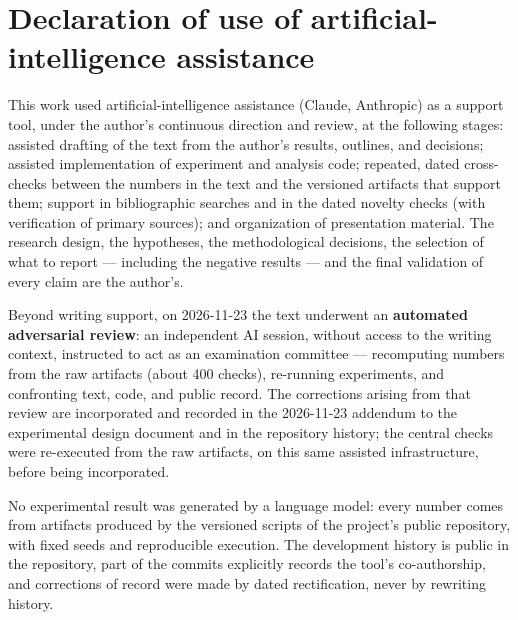 \chapter*{Declaration of use of artificial-intelligence assistance}
\thispagestyle{empty}

This work used artificial-intelligence assistance (Claude, Anthropic)
as a support tool, under the author's continuous direction and review,
at the following stages: assisted drafting of the text from the
author's results, outlines, and decisions; assisted implementation of
experiment and analysis code; repeated, dated cross-checks between the
numbers in the text and the versioned artifacts that support them;
support in bibliographic searches and in the dated novelty checks
(with verification of primary sources); and organization of
presentation material. The research design, the hypotheses, the
methodological decisions, the selection of what to report ---
including the negative results --- and the final validation of every
claim are the author's.

Beyond writing support, on 2026-11-23 the text underwent an
\textbf{automated adversarial review}: an independent AI session,
without access to the writing context, instructed to act as an
examination committee --- recomputing numbers from the raw artifacts
(about 400 checks), re-running experiments, and confronting text,
code, and public record. The corrections arising from that review are
incorporated and recorded in the 2026-11-23 addendum to the
experimental design document and in the repository history; the
central checks were re-executed from the raw artifacts, on this same
assisted infrastructure, before being incorporated.

No experimental result was generated by a language model: every
number comes from artifacts produced by the versioned scripts of the
project's public repository, with fixed seeds and reproducible
execution. The development history is public in the repository, part
of the commits explicitly records the tool's co-authorship, and
corrections of record were made by dated rectification, never by
rewriting history.
